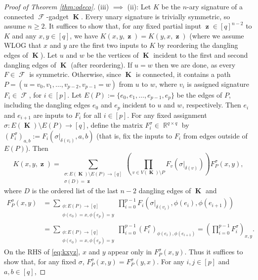 \documentclass{theoretics}
\DeclareMathOperator{\rr}{\mathbb{R}}
\DeclareMathOperator{\vk}{\mathbf{K}}
\DeclareMathOperator{\vz}{\mathbf{z}}
\DeclareMathOperator{\fc}{\mathcal{F}}
\begin{document}
\begin{proof}[Proof of Theorem \ref{thm:odeco}]
    (iii) $\implies$ (ii): Let $K$ be the $n$-ary signature of a connected $\fc$-gadget $\vk$.
    Every unary signature is trivially symmetric, so assume $n \geq 2$. It suffices to show that,
    for any fixed partial input $\vz \in [q]^{n-2}$ to $K$ and any $x,y \in [q]$, we have
    $K(x,y,\vz) = K(y,x,\vz)$ (where we assume WLOG that $x$ and $y$ are the first two inputs to $K$
    by reordering the dangling edges of $\vk$). Let $u$ and $w$ be the vertices of $\vk$ incident to
    the first and second dangling edges of $\vk$ (after reordering).
    If $u = w$ then we are done, as every $F \in \fc$ is symmetric.
    Otherwise, since $\vk$ is connected, it contains a path 
    $P = (u = v_0,v_1,\ldots,v_{p-2},v_{p-1} = w)$ 
    from $u$ to $w$, where $v_i$ is assigned signature $F_i \in \fc$, for $i \in [p]$.
    Let $E(P) := \{e_0,e_1,\ldots,e_{p-1},e_p\}$ be the edges of $P$, including the dangling edges
    $e_0$ and $e_p$ incident to $u$ and $w$, respectively.
    Then $e_i$ and $e_{i+1}$ are inputs to $F_i$ for all $i \in [p]$. 
    For any fixed assignment $\sigma: E(\vk) \setminus E(P) \to [q]$,
    define the matrix $F^\sigma_i \in \rr^{q \times q}$ by 
    $(F^\sigma_i)_{a,b} := F_i(\sigma|_{\delta(v_i)},a,b)$ 
    (that is, fix the inputs to $F_i$ from edges outside of $E(P)$). Then
    \begin{equation}
        K(x,y,\vz) = 
        \sum_{\substack{\sigma: E(\vk) \setminus E(P) \to [q] \\ \sigma(D) = \vz}} 
        \left(\prod_{v \in V(\vk) \setminus P} F_v(\sigma|_{\delta(v)})\right) 
        F^\sigma_P(x,y),
        \label{eq:kxyz}
    \end{equation}
    where $D$ is the ordered list of the last $n-2$ dangling edges of $\vk$ and
    \begin{align*}
        F^\sigma_P(x,y) 
        &= \sum_{\substack{\phi: E(P) \to [q] \\ \phi(e_0)=x,\phi(e_p)=y}} 
            \prod_{i=0}^{p-1} F_i(\sigma|_{\delta(v_i)}, \phi(e_i),\phi(e_{i+1})) \\
        &= \sum_{\substack{\phi: E(P) \to [q] \\ \phi(e_0)=x,\phi(e_p)=y}} 
        \prod_{i=0}^{p-1} (F^\sigma_i)_{\phi(e_i),\phi(e_{i+1})}
        = \left(\prod_{i=0}^{p-1} F^\sigma_i\right)_{x,y}.
    \end{align*}
    On the RHS of \eqref{eq:kxyz}, $x$ and $y$
    appear only in $F_P^\sigma(x,y)$. Thus it suffices to show that, for any fixed $\sigma$,
    $F^\sigma_P(x,y) = F^\sigma_P(y,x)$. For any $i,j \in [p]$ and $a,b \in [q]$,

\end{proof}
\end{document}
